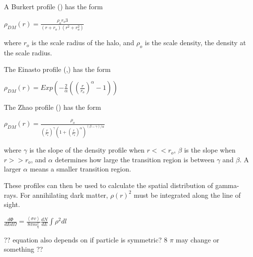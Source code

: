 A Burkert profile (\cite{burkertprofile}) has the form

$ \rho_{DM} \left( r \right) = \frac{ \rho_o r_o3}{ \left( r + r_o \right) \left( r^2 + r_o^2 \right)} $ \label{eqn:burkert}

where $r_o$ is the scale radius of the halo, and $\rho_o$ is the scale density, the density at the scale radius.

The Einasto profile (\cite{einastoprofile1},\cite{einastoprofile2}) has the form

$ \rho_{DM} \left( r \right) = Exp \left( - \frac{2}{\alpha} \left( {\left( \frac{r}{r_o} \right)}^{\alpha} - 1 \right) \right)$ \label{eqn:einasto}

The Zhao profile (\cite{zhaoprofile}) has the form

$ \rho_{DM} \left( r \right) = \frac{\rho_o}{ {\left( \frac{r}{r_o} \right)}^{\gamma} {\left( 1 + {\left( \frac{r}{r_o} \right)}^{\alpha} \right)}^{ \left(\beta - \gamma \right) / \alpha} } $ \label{eqn:zhao}

where $\gamma$ is the slope of the density profile when $r << r_o$, $\beta$ is the slope when $r >> r_o$, and $\alpha$ determines how large the transition region is between $\gamma$ and $\beta$.
A larger $\alpha$ means a smaller transition region.

These profiles can then be used to calculate the spatial distribution of gamma-rays.
For annihilating dark matter, $\rho\left(r\right)^2$ must be integrated along the line of sight.

$ \frac{d\Phi}{dE d\Omega}= \frac{ \left \langle \sigma v \right \rangle }{8 \pi m_\chi^2} \frac{dN}{dE} \int \rho^2 dl $ \label{eqn:dmflux}

?? equation also depends on if particle is symmetric? 8 $\pi$ may change or something ??



